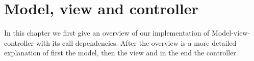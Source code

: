 \chapter{Model, view and controller}
In this chapter we first give an overview of our implementation of Model-view-controller with its call dependencies. After the overview is a more detailed explanation of first the model, then the view and in the end the controller.  

